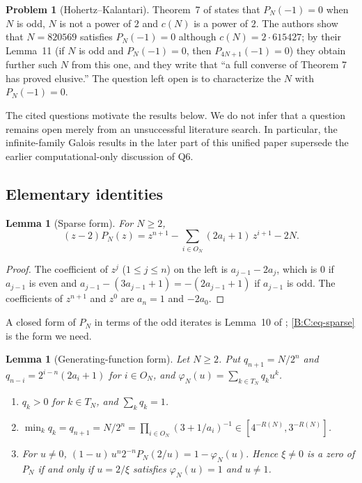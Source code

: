\documentclass[11pt,a4paper]{article}
\newtheorem{lemma}[theorem]{Lemma}
\theoremstyle{definition}
\newtheorem{problem}[theorem]{Problem}
\theoremstyle{remark}
\numberwithin{equation}{section}
\begin{document}
\begin{problem}[Hohertz--Kalantari]\label{B:C:prob-HK}
Theorem~7 of \cite{R025} states that $P_N(-1)=0$ when $N$ is odd, $N$ is
not a power of $2$ and $c(N)$ is a power of $2$.  The authors show that
$N=820569$ satisfies $P_N(-1)=0$ although $c(N)=2\cdot615427$; by their
Lemma~11 (if $N$ is odd and $P_N(-1)=0$, then $P_{4N+1}(-1)=0$) they obtain further
such $N$ from this one, and they write that
``a full converse of Theorem 7 has proved elusive.''  The question left open is to
characterize the $N$ with $P_N(-1)=0$.
\end{problem}

The cited questions motivate the results below.  We do not infer that a
question remains open merely from an unsuccessful literature search.  In
particular, the infinite-family Galois results in the later part of this
unified paper supersede the earlier computational-only discussion of Q6.

\subsection{Elementary identities}\label{B:C:ssec-identities}

\begin{lemma}[Sparse form]\label{B:C:lem-sparse}
For $N\ge2$,
\begin{equation}\label{B:C:eq-sparse}
(z-2)P_N(z)=z^{n+1}-\sum_{i\in O_N}(2a_i+1)\,z^{i+1}-2N .
\end{equation}
\end{lemma}

\begin{proof}
The coefficient of $z^j$ ($1\le j\le n$) on the left is $a_{j-1}-2a_j$, which is
$0$ if $a_{j-1}$ is even and $a_{j-1}-(3a_{j-1}+1)=-(2a_{j-1}+1)$ if $a_{j-1}$ is
odd.  The coefficients of $z^{n+1}$ and $z^0$ are $a_n=1$ and $-2a_0$.
\end{proof}

A closed form of $P_N$ in terms of the odd iterates is Lemma~10 of
\cite{R025}; \eqref{B:C:eq-sparse} is the form we need.

\begin{lemma}[Generating-function form]\label{B:C:lem-pgf}
Let $N\ge2$.  Put $q_{n+1}=N/2^n$ and $q_{n-i}=2^{i-n}(2a_i+1)$ for $i\in O_N$,
and $\varphi_N(u)=\sum_{k\in T_N}q_ku^k$.
\begin{enumerate}
\item $q_k>0$ for $k\in T_N$, and $\sum_kq_k=1$.
\item $\min_kq_k=q_{n+1}=N/2^n=\prod_{i\in O_N}(3+1/a_i)^{-1}\in[4^{-R(N)},3^{-R(N)}]$.
\item For $u\ne0$, $(1-u)\,u^n2^{-n}P_N(2/u)=1-\varphi_N(u)$.  Hence $\xi\ne0$ is a
zero of $P_N$ if and only if $u=2/\xi$ satisfies $\varphi_N(u)=1$ and $u\ne1$.
\end{enumerate}
\end{lemma}
\end{document}
